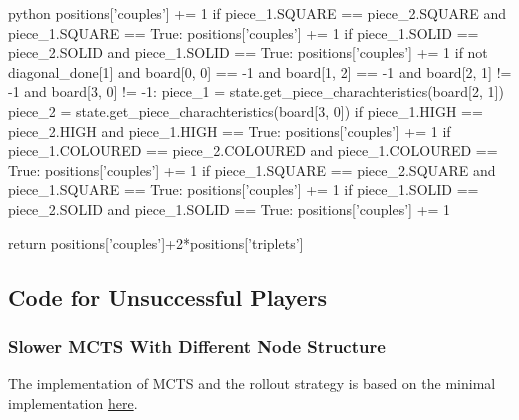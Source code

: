 \begin{mintedbox}{python}
            positions['couples'] += 1
        if piece_1.SQUARE == piece_2.SQUARE and piece_1.SQUARE == True:
            positions['couples'] += 1
        if piece_1.SOLID == piece_2.SOLID and piece_1.SOLID == True:
            positions['couples'] += 1
    if not diagonal_done[1] and board[0, 0] == -1 and board[1, 2] == -1 and board[2, 1] != -1 and board[3, 0] != -1:
        piece_1 = state.get_piece_charachteristics(board[2, 1])
        piece_2 = state.get_piece_charachteristics(board[3, 0])
        if piece_1.HIGH == piece_2.HIGH and piece_1.HIGH == True:
            positions['couples'] += 1
        if piece_1.COLOURED == piece_2.COLOURED and piece_1.COLOURED == True:
            positions['couples'] += 1
        if piece_1.SQUARE == piece_2.SQUARE and piece_1.SQUARE == True:
            positions['couples'] += 1
        if piece_1.SOLID == piece_2.SOLID and piece_1.SOLID == True:
            positions['couples'] += 1

    return positions['couples']+2*positions['triplets']

\end{mintedbox}

\subsection{Code for Unsuccessful Players}


\subsubsection{Slower MCTS With Different Node Structure}

The implementation of MCTS and the rollout strategy is based on the minimal implementation \href{https://gist.github.com/qpwo/c538c6f73727e254fdc7fab81024f6e1}{here}.

